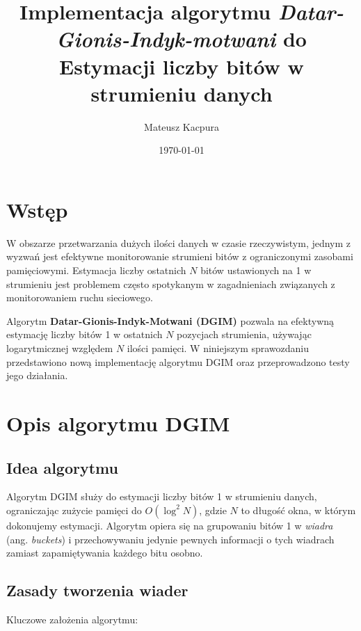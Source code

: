 \documentclass{article}
\begin{document}
\title{Implementacja algorytmu \textit{Datar-Gionis-Indyk-motwani} do Estymacji liczby bitów w strumieniu danych}
\author{Mateusz Kacpura}
\date{\today}

\maketitle

\tableofcontents

\newpage

\section{Wstęp}

W obszarze przetwarzania dużych ilości danych w czasie rzeczywistym, jednym z wyzwań jest efektywne monitorowanie strumieni bitów z ograniczonymi zasobami pamięciowymi. Estymacja liczby ostatnich $N$ bitów ustawionych na 1 w strumieniu jest problemem często spotykanym w zagadnieniach związanych z monitorowaniem ruchu sieciowego.

Algorytm \textbf{Datar-Gionis-Indyk-Motwani (DGIM)} \cite{dgim2002} pozwala na efektywną estymację liczby bitów 1 w ostatnich $N$ pozycjach strumienia, używając logarytmicznej względem $N$ ilości pamięci. W niniejszym sprawozdaniu przedstawiono nową implementację algorytmu DGIM oraz przeprowadzono testy jego działania.

\section{Opis algorytmu DGIM}

\subsection{Idea algorytmu}

Algorytm DGIM służy do estymacji liczby bitów 1 w strumieniu danych, ograniczając zużycie pamięci do $O(\log^2 N)$, gdzie $N$ to długość okna, w którym dokonujemy estymacji. Algorytm opiera się na grupowaniu bitów 1 w \textit{wiadra} (ang. \emph{buckets}) i przechowywaniu jedynie pewnych informacji o tych wiadrach zamiast zapamiętywania każdego bitu osobno.

\subsection{Zasady tworzenia wiader}

Kluczowe założenia algorytmu:
\end{document}
